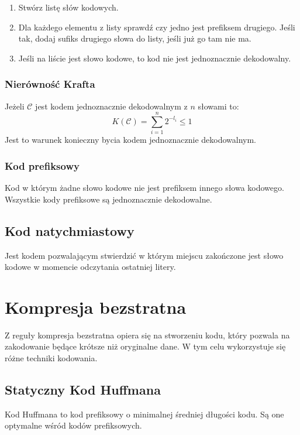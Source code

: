 \documentclass{../notatki}
\begin{document}
\begin{enumerate}
  \item Stwórz listę słów kodowych.
  \item Dla każdego elementu z listy sprawdź czy jedno jest prefiksem
    drugiego. Jeśli tak, dodaj sufiks drugiego słowa do listy, jeśli
    już go tam nie ma.
  \item Jeśli na liście jest słowo kodowe, to kod nie jest jednoznacznie
    dekodowalny.
\end{enumerate}

\subsubsection{Nierówność Krafta}

Jeżeli $\mathcal{C}$ jest kodem jednoznacznie dekodowalnym z $n$ słowami to:
$$
K(\mathcal{C}) = \sum_{i=1}^{n}2^{-l_i} \leq 1
$$
Jest to warunek konieczny bycia kodem jednoznacznie dekodowalnym.

\subsubsection{Kod prefiksowy}

Kod w którym żadne słowo kodowe nie jest prefiksem innego słowa
kodowego. Wszystkie kody prefiksowe są jednoznacznie dekodowalne.

\subsection{Kod natychmiastowy}

Jest kodem pozwalającym stwierdzić w którym miejscu zakończone jest
słowo kodowe w momencie odczytania ostatniej litery.

\section{Kompresja bezstratna}

Z reguły kompresja bezstratna opiera się na stworzeniu kodu, który
pozwala na zakodowanie będące krótsze niż oryginalne dane. W tym celu
wykorzystuje się różne techniki kodowania.

\subsection{Statyczny Kod Huffmana}

Kod Huffmana to kod prefiksowy o minimalnej średniej długości kodu.
Są one optymalne wśród kodów prefiksowych.
\end{document}
